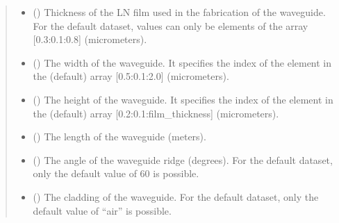 \documentclass[a4paper,10pt,english]{sphinxmanual}
\begin{document}
\begin{fulllineitems}
\begin{fulllineitems}
\begin{quote}
\begin{description}
\end{description}\end{quote}

\end{fulllineitems}

\begin{quote}\begin{description}
\begin{itemize}
\item {} 
\sphinxAtStartPar
{} () \textendash{} Thickness of the LN film used in the fabrication of the waveguide. For the default dataset, values can only be elements of the array {[}0.3:0.1:0.8{]} (micrometers).

\item {} 
\sphinxAtStartPar
{} () \textendash{} The width of the waveguide. It specifies the index of the element in the (default) array {[}0.5:0.1:2.0{]} (micrometers).

\item {} 
\sphinxAtStartPar
{} () \textendash{} The height of the waveguide. It specifies the index of the element in the (default) array {[}0.2:0.1:film\_thickness{]} (micrometers).

\item {} 
\sphinxAtStartPar
{} () \textendash{} The length of the waveguide (meters).

\item {} 
\sphinxAtStartPar
{} (\sphinxstyleliteralemphasis{\sphinxupquote{, }}) \textendash{} The angle of the waveguide ridge (degrees). For the default dataset, only the default value of 60 is possible.

\item {} 
\sphinxAtStartPar
{} (\sphinxstyleliteralemphasis{\sphinxupquote{, }}) \textendash{} The cladding of the waveguide. For the default dataset, only the default value of “air” is possible.


\end{itemize}
\end{description}
\end{quote}
\end{fulllineitems}
\end{document}
